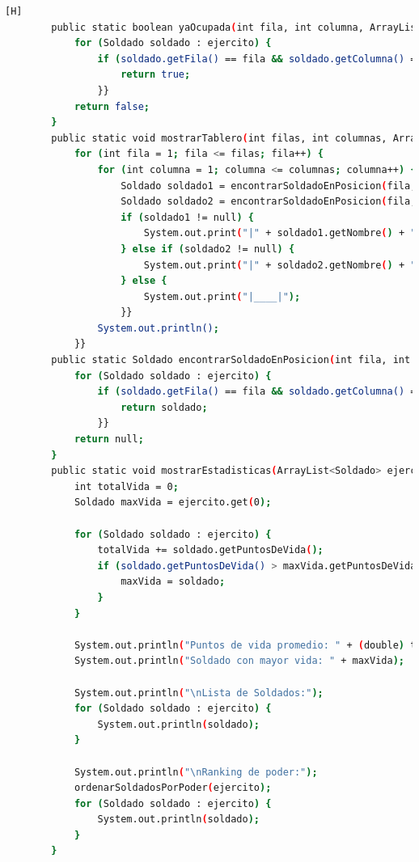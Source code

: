 \documentclass{article}
\begin{document}
\begin{lstlisting}[language=bash,caption={Creando la clase principal de VideoJuego_v3.java}][H]
	    public static boolean yaOcupada(int fila, int columna, ArrayList<Soldado> ejercito) {
	        for (Soldado soldado : ejercito) {
	            if (soldado.getFila() == fila && soldado.getColumna() == columna) {
	                return true;
	            }}
	        return false;
	    }
	    public static void mostrarTablero(int filas, int columnas, ArrayList<Soldado> ejercito1, ArrayList<Soldado> ejercito2) {
	        for (int fila = 1; fila <= filas; fila++) {
	            for (int columna = 1; columna <= columnas; columna++) { 
	                Soldado soldado1 = encontrarSoldadoEnPosicion(fila, columna, ejercito1);
	                Soldado soldado2 = encontrarSoldadoEnPosicion(fila, columna, ejercito2);
	                if (soldado1 != null) {
	                    System.out.print("|" + soldado1.getNombre() + "|");
	                } else if (soldado2 != null) {
	                    System.out.print("|" + soldado2.getNombre() + "|");
	                } else {
	                    System.out.print("|____|");
	                }}
	            System.out.println(); 
	        }}
	    public static Soldado encontrarSoldadoEnPosicion(int fila, int columna, ArrayList<Soldado> ejercito) {
	        for (Soldado soldado : ejercito) {
	            if (soldado.getFila() == fila && soldado.getColumna() == columna) {
	                return soldado;
	            }}
	        return null;
	    }
	    public static void mostrarEstadisticas(ArrayList<Soldado> ejercito) {
	        int totalVida = 0;
	        Soldado maxVida = ejercito.get(0);

	        for (Soldado soldado : ejercito) {
	            totalVida += soldado.getPuntosDeVida();
	            if (soldado.getPuntosDeVida() > maxVida.getPuntosDeVida()) {
	                maxVida = soldado;
	            }
	        }

	        System.out.println("Puntos de vida promedio: " + (double) totalVida / ejercito.size());
	        System.out.println("Soldado con mayor vida: " + maxVida);

	        System.out.println("\nLista de Soldados:");
	        for (Soldado soldado : ejercito) {
	            System.out.println(soldado);
	        }

	        System.out.println("\nRanking de poder:");
	        ordenarSoldadosPorPoder(ejercito);
	        for (Soldado soldado : ejercito) {
	            System.out.println(soldado);
	        }
	    }


\end{lstlisting}
\end{document}
